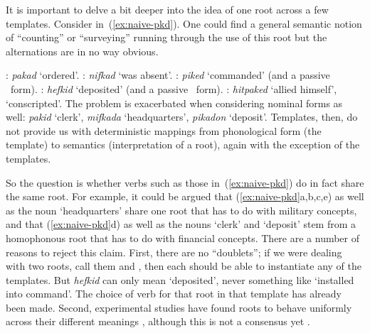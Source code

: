 \begin{exe}
\begin{xlist}
\begin{exe}
\begin{exe}
\begin{exe}
\begin{exe}
\begin{xlist}
\begin{exe}
\begin{xlist}
\begin{xlist}
\begin{xlist}
\begin{exe}
\begin{xlist}
\begin{exe}
\begin{exe}
\begin{xlist}
\begin{exe}
\begin{xlist}
\begin{exe}
\begin{exe}
\begin{xlist}
It is important to delve a bit deeper into the idea of one root across a few templates. Consider  in~(\ref{ex:naive-pkd}).  One could find a general semantic notion of ``counting'' or ``surveying'' running through the use of this root but the alternations are in no way obvious. 
 \begin{exe}
 \ex \label{ex:naive-pkd} 
 \begin{xlist} 
   \ex  \tkal: \emph{pakad} `ordered'. 
   \ex  \tnif: \emph{nifkad} `was absent'. 
   \ex  \tpie: \emph{piked} `commanded' (and a passive \tpua~form). 
   \ex  \thif: \emph{hefkid} `deposited' (and a passive \thuf~form). 
   \ex  \thit: \emph{hitpaked} `allied himself', `conscripted'. 
 \z
\z 
The problem is exacerbated when considering nominal forms as well: \emph{pakid} `clerk', \emph{mifkada} `headquarters', \emph{pikadon} `deposit'. Templates, then, do not provide us with deterministic mappings from phonological form (the template) to semantics (interpretation of a root), again with the exception of the  templates.

So the question is whether verbs such as those in~(\ref{ex:naive-pkd}) do in fact share the same root. For example, it could be argued that (\ref{ex:naive-pkd}a,b,c,e) as well as the noun `headquarters' share one root that has to do with military concepts, and that (\ref{ex:naive-pkd}d) as well as the nouns `clerk' and `deposit' stem from a homophonous root that has to do with financial concepts. There are a number of reasons to reject this claim. First, there are no ``doublets''; if we were dealing with two roots, call them  and , then each should be able to instantiate any of the templates. But \emph{hefkid} can only mean `deposited', never something like `installed into command'. The choice of verb for that root in that template has already been made. Second, experimental studies have found roots to behave uniformly across their different meanings \citep{deutsch16,deutschetal16,deutschkuperman18,kastneretal18}, although this is not a consensus yet \citep{fmdpmetal05jml,hellerbendavid15}.
		

\end{xlist}
\end{exe}
\end{xlist}
\end{exe}
\end{exe}
\end{xlist}
\end{exe}
\end{xlist}
\end{exe}
\end{exe}
\end{xlist}
\end{exe}
\end{xlist}
\end{xlist}
\end{xlist}
\end{exe}
\end{xlist}
\end{exe}
\end{exe}
\end{exe}
\end{exe}
\end{xlist}
\end{exe}
